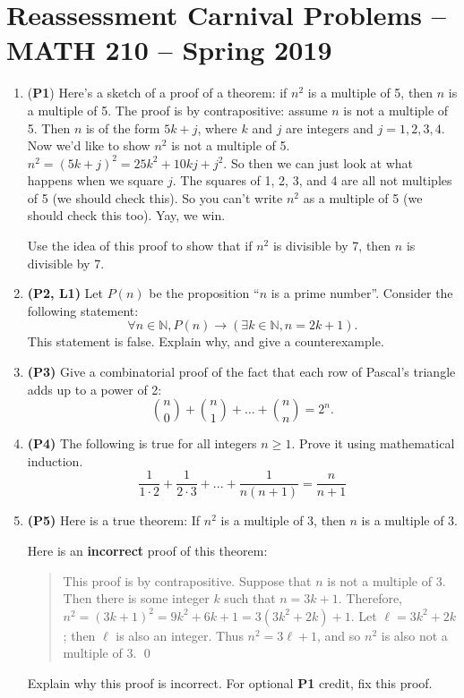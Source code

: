 \documentclass[12pt]{article}
\begin{document}
\pagestyle{empty}


\section*{Reassessment Carnival Problems -- MATH 210 -- Spring 2019}

\begin{enumerate}

\item (\textbf{P1}) Here's a sketch of a proof of a theorem: if $n^2$ is a multiple of 5, then $n$ is a multiple of 5. The proof is by contrapositive: assume $n$ is not a multiple of 5. Then $n$ is of the form $5k + j$, where $k$ and $j$ are integers and $j = 1, 2, 3, 4$. Now we'd like to show $n^2$ is not a multiple of 5. $n^2 = (5k+j)^2 = 25k^2 + 10kj + j^2$. So then we can just look at what happens when we square $j$. The squares of 1, 2, 3, and 4 are all not multiples of 5 (we should check this). So you can't write $n^2$ as a multiple of 5 (we should check this too). Yay, we win.

Use the idea of this proof to show that if $n^2$ is divisible by 7, then $n$ is divisible by 7.


\item \textbf{(P2, L1)} Let $P(n)$ be the proposition ``$n$ is a prime number''. Consider the following statement: 
\[ \forall n \in \mathbb{N}, P(n) \to (\exists k\in \mathbb{N}, n = 2k+1). \]
This statement is false. Explain why, and give a counterexample.

\item \textbf{(P3)} Give a combinatorial proof of the fact that each row of Pascal's triangle adds up to a power of 2:
\[\binom{n}{0} + \binom{n}{1} + \ldots + \binom{n}{n} = 2^n. \]

\item \textbf{(P4)} The following is true for all integers $n \geq 1$. Prove it using mathematical induction.
\[\frac{1}{1 \cdot 2} + \frac{1}{2 \cdot 3} + ... + \frac{1}{n(n+1)}=\frac{n}{n+1}\]

\item \textbf{(P5)} Here is a true theorem: If $n^2$ is a multiple of 3, then $n$ is a multiple of 3. 

Here is an \textbf{incorrect} proof of this theorem:
\begin{quotation}
This proof is by contrapositive. Suppose that $n$ is not a multiple of 3. Then there is some integer $k$ such that $n = 3k + 1$. Therefore, $n^2 = (3k+1)^2 = 9k^2 + 6k + 1 = 3(3k^2 + 2k) + 1$. Let $\ell = 3k^2 + 2k$; then $\ell$ is also an integer. Thus $n^2 = 3\ell + 1$, and so $n^2$ is also not a multiple of 3. \qed
\end{quotation}
Explain why this proof is incorrect. For optional \textbf{P1} credit, fix this proof.



\end{enumerate}
\end{document}

